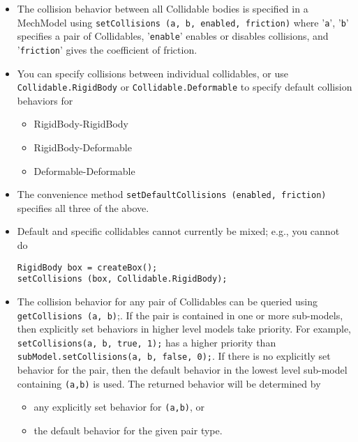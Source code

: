 \documentclass{article}
\begin{document}
\begin{itemize}

\item The collision behavior between all Collidable bodies is specified 
in a MechModel using {\tt setCollisions (a, b, enabled, friction)} where
'{\tt a}', '{\tt b}' specifies a pair of Collidables, '{\tt enable}' enables 
or disables collisions, and '{\tt friction}' gives the coefficient of 
friction.

\item You can specify collisions between individual collidables, or use 
{\tt Collidable.RigidBody} or {\tt Collidable.Deformable} to specify default
collision behaviors for 

\begin{itemize}

\item RigidBody-RigidBody

\item RigidBody-Deformable

\item Deformable-Deformable

\end{itemize}

\item The convenience method {\tt setDefaultCollisions (enabled, friction)} 
specifies all three of the above. 

\item Default and specific collidables cannot currently be mixed; e.g., 
you cannot do 
\begin{lstlisting}[]
RigidBody box = createBox();
setCollisions (box, Collidable.RigidBody);
\end{lstlisting}

\item The collision behavior for any pair of Collidables can be queried
using {\tt getCollisions (a, b)};. If the pair is contained in one or more 
sub-models, then explicitly set behaviors in higher level models take 
priority. For example, {\tt setCollisions(a, b, true, 1);} has a higher 
priority than {\tt subModel.setCollisions(a, b, false, 0);}. If there is
no explicitly set behavior for the pair, then the default behavior in 
the lowest level sub-model containing {\tt (a,b)} is used. The returned 
behavior will be determined by

\begin{itemize}

\item any explicitly set behavior for {\tt (a,b)}, or
\item the default behavior for the given pair type. 

\end{itemize}

\end{itemize}
\end{document}
